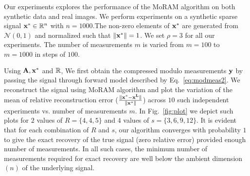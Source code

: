 Our experiments explores the performance of the MoRAM algorithm on both synthetic data and real images. We perform experiments on a synthetic sparse signal $\mathbf{x^*} \in {\mathbb{R}}^n$ with $n=1000$.The non-zero elements of $\mathbf{x^*}$ are generated from $\mathcal{N}(0,1)$ and normalized such that $\|\mathbf{x^*}\| =1$. We set $\rho=3$ for all our experiments. The number of measurements $m$ is varied from $m = 100$ to $m=1000$ in steps of $100$. 


Using $\mathbf{A, x^*}$ and ${\mathbb{R}}$, We first obtain the compressed modulo measurements $\mathbf{y}$ by passing the signal through forward model described by Eq.~\ref{eq:modmeas2}. We reconstruct the signal using MoRAM algorithm and plot the variation of the mean of relative reconstruction error ($\frac{\|\mathbf{x^*-x^L}\|}{\|\mathbf{x^*}\|}$) across $10$ such independent experiments vs. number of measurements $m$. In Fig.~\ref{fig:plot} we depict such plots for $2$ values of $R=\{4,4,5\}$ and $4$ values of $s=\{3,6,9,12\}$. It is evident that for each combination of $R$ and $s$, our algorithm converges with probability $1$ to give the exact recovery of the true signal (zero relative error) provided enough number of measurements. In all such cases, the minimum number of measurements required for exact recovery are well below the ambient dimension $(n)$ of the underlying signal. 

